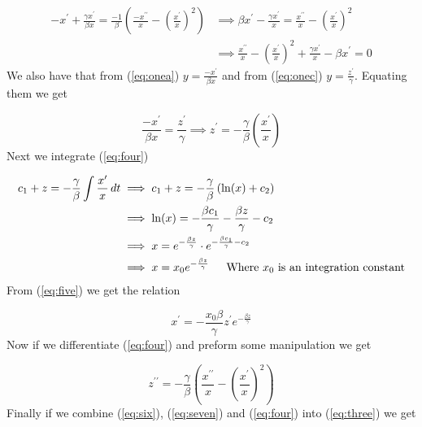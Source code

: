 \begin{equation} \label{eq:three}
	\begin{split}
		-x^{\prime} + \frac{\gamma x^{\prime}}{\beta x} =
		\frac{-1}{\beta}\left(\frac{-x^{\prime\prime}}{x} - \left(\frac{x^{\prime}}{x}\right)^{2}\right)
		 & \implies \beta x^{\prime} - \frac{\gamma x^{\prime}}{x} = \frac{x^{\prime\prime}}{x} - \left(\frac{x^{\prime}}{x}\right)^{2}    \\
		 & \implies \frac{x^{\prime\prime}}{x} - \left(\frac{x^{\prime}}{x}\right)^{2} + \frac{\gamma x^{\prime}}{x} - \beta x^{\prime}= 0
	\end{split}
\end{equation}
We also have that from (\ref{eq:onea})  $y = \frac{-x^{\prime}}{\beta x}$ and from (\ref{eq:onec})  $y = \frac{z^{\prime}}{\gamma}$.
Equating them we get

\begin{equation} \label{eq:four}
	\frac{-x^{\prime}}{\beta x} = \frac{z^{\prime}}{\gamma}
	\implies z^{\prime} = -\frac{\gamma}{\beta}\left(\frac{x^{\prime}}{x}\right)
\end{equation}
\newpage Next we integrate (\ref{eq:four}) 


\begin{equation} \label{eq:five}
	\begin{split}
		c_{1} + z = -\frac{\gamma}{\beta} \int \frac{x^{\prime}}{x} \,dt
		 & \implies c_{1} + z = -\frac{\gamma}{\beta}\left(\ln(x) + c_{2}\right)                                       \\
		 & \implies \ln(x) = -\frac{\beta c_{1}}{\gamma} -\frac{\beta z}{\gamma} - c_{2}                               \\
		 & \implies x = e^{-\frac{\beta z}{\gamma}} \cdot e^{-\frac{\beta c_{1}}{\gamma} - c_{2}}                      \\
		 & \implies x = x_{0}e^{-\frac{\beta z}{\gamma}}  \hspace{\parindent}  \textrm{Where } x_{0} \textrm{ is an integration constant}
	\end{split}
\end{equation}
From (\ref{eq:five}) we get the relation

\begin{equation} \label{eq:six}
	x^{\prime} = -\frac{x_{0}\beta}{\gamma} z^{\prime} e^{-\frac{\beta z}{\gamma}}
\end{equation}
Now if we differentiate (\ref{eq:four}) and preform some manipulation we get

\begin{equation} \label{eq:seven}
	z^{\prime\prime} = -\frac{\gamma}{\beta}\left(\frac{x^{\prime\prime}}{x} - \left(\frac{x^{\prime}}{x}\right)^{2} \right)
\end{equation}
Finally if we combine (\ref{eq:six}), (\ref{eq:seven}) and (\ref{eq:four}) into (\ref{eq:three}) we get

